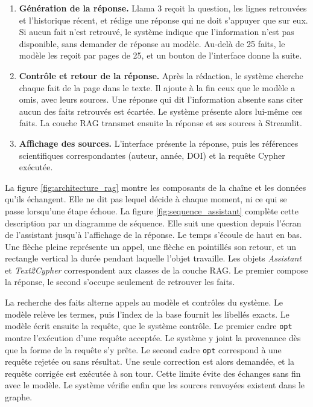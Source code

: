 \begin{enumerate}[label=\textbf{\arabic*.}, leftmargin=1.2cm]
    \item \textbf{Génération de la réponse.} Llama 3 reçoit la question, les lignes retrouvées et l'historique récent, et rédige une réponse qui ne doit s'appuyer que sur eux. Si aucun fait n'est retrouvé, le système indique que l'information n'est pas disponible, sans demander de réponse au modèle. Au-delà de 25 faits, le modèle les reçoit par pages de 25, et un bouton de l'interface donne la suite.
    \item \textbf{Contrôle et retour de la réponse.} Après la rédaction, le système cherche chaque fait de la page dans le texte. Il ajoute à la fin ceux que le modèle a omis, avec leurs sources. Une réponse qui dit l'information absente sans citer aucun des faits retrouvés est écartée. Le système présente alors lui-même ces faits. La couche RAG transmet ensuite la réponse et ses sources à Streamlit.
    \item \textbf{Affichage des sources.} L'interface présente la réponse, puis les références scientifiques correspondantes (auteur, année, DOI) et la requête Cypher exécutée.
\end{enumerate}

La figure \ref{fig:architecture_rag} montre les composants de la chaîne et les données qu'ils échangent. Elle ne dit pas lequel décide à chaque moment, ni ce qui se passe lorsqu'une étape échoue. La figure \ref{fig:sequence_assistant} complète cette description par un diagramme de séquence. Elle suit une question depuis l'écran de l'assistant jusqu'à l'affichage de la réponse. Le temps s'écoule de haut en bas. Une flèche pleine représente un appel, une flèche en pointillés son retour, et un rectangle vertical la durée pendant laquelle l'objet travaille. Les objets \textit{Assistant} et \textit{Text2Cypher} correspondent aux classes de la couche RAG. Le premier compose la réponse, le second s'occupe seulement de retrouver les faits.

La recherche des faits alterne appels au modèle et contrôles du système. Le modèle relève les termes, puis l'index de la base fournit les libellés exacts. Le modèle écrit ensuite la requête, que le système contrôle. Le premier cadre \texttt{opt} montre l'exécution d'une requête acceptée. Le système y joint la provenance dès que la forme de la requête s'y prête. Le second cadre \texttt{opt} correspond à une requête rejetée ou sans résultat. Une seule correction est alors demandée, et la requête corrigée est exécutée à son tour. Cette limite évite des échanges sans fin avec le modèle. Le système vérifie enfin que les sources renvoyées existent dans le graphe.

